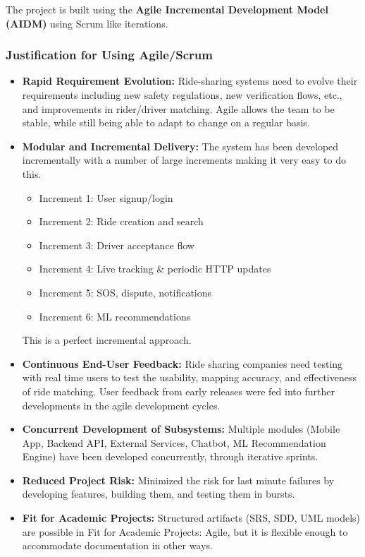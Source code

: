 The project is built using the \textbf{Agile Incremental Development Model (AIDM)} using Scrum like iterations.


\subsubsection{Justification for Using Agile/Scrum}

\begin{itemize}
    \item \textbf{Rapid Requirement Evolution:} Ride-sharing systems need to evolve their requirements including new safety regulations, new verification flows, etc., and improvements in rider/driver matching. Agile allows the team to be stable, while still being able to adapt to change on a regular basis.
    
    \item \textbf{Modular and Incremental Delivery:} The system has been developed incrementally with a number of large increments making it very easy to do this.
    \begin{itemize}
        \item Increment 1: User signup/login
        \item Increment 2: Ride creation and search
        \item Increment 3: Driver acceptance flow
        \item Increment 4: Live tracking \& periodic HTTP updates
        \item Increment 5: SOS, dispute, notifications
        \item Increment 6: ML recommendations
    \end{itemize}
    This is a perfect incremental approach.
    
    \item \textbf{Continuous End-User Feedback:} Ride sharing companies need testing with real time users to test the usability, mapping accuracy, and effectiveness of ride matching. User feedback from early releases were fed into further developments in the agile development cycles.
    
    \item \textbf{Concurrent Development of Subsystems:} Multiple modules (Mobile App, Backend API, External Services, Chatbot, ML Recommendation Engine) have been developed concurrently, through iterative sprints.
    
    \item \textbf{Reduced Project Risk:} Minimized the risk for last minute failures by developing features, building them, and testing them in bursts.
    
    \item \textbf{Fit for Academic Projects:} Structured artifacts (SRS, SDD, UML models) are possible in Fit for Academic Projects: Agile, but it is flexible enough to accommodate documentation in other ways.
\end{itemize}

